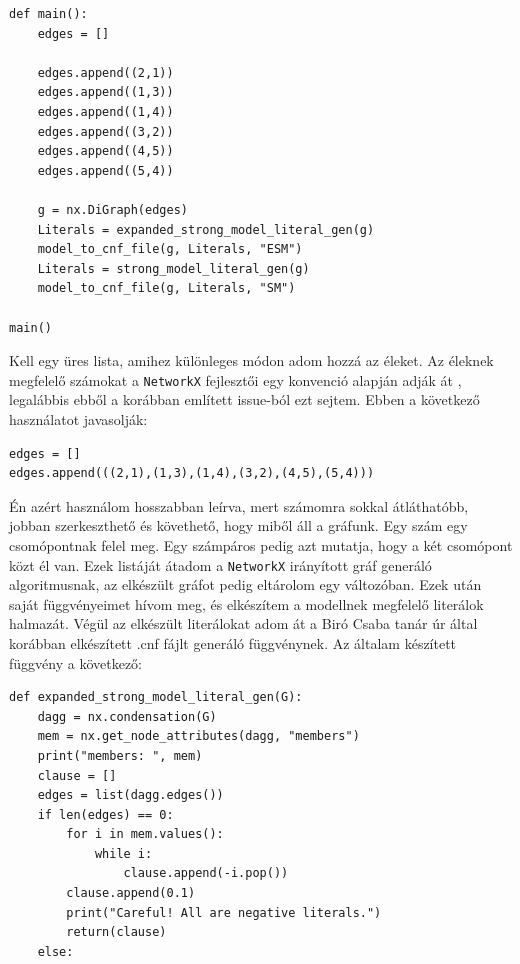 \documentclass[
]{thesis-ekf}
\theoremstyle{definition}
\theoremstyle{remark}
\begin{document}
	\begin{lstlisting}
def main():
	edges = []
	
	edges.append((2,1))
	edges.append((1,3))
	edges.append((1,4))
	edges.append((3,2))
	edges.append((4,5))
	edges.append((5,4))
	
	g = nx.DiGraph(edges)
	Literals = expanded_strong_model_literal_gen(g)
	model_to_cnf_file(g, Literals, "ESM")
	Literals = strong_model_literal_gen(g)
	model_to_cnf_file(g, Literals, "SM")
	
main()
	\end{lstlisting}

	
	Kell egy üres lista, amihez különleges módon adom hozzá az éleket. Az éleknek megfelelő számokat a \texttt{NetworkX} fejlesztői egy konvenció alapján adják át \cite{link-github-issue}, legalábbis ebből a korábban említett issue-ból ezt sejtem. Ebben a következő használatot javasolják:
	
	\begin{lstlisting}
edges = []
edges.append(((2,1),(1,3),(1,4),(3,2),(4,5),(5,4)))
	\end{lstlisting}
	
	Én azért használom hosszabban leírva, mert számomra sokkal átláthatóbb, jobban szerkeszthető és követhető, hogy miből áll a gráfunk. Egy szám egy csomópontnak felel meg. Egy számpáros pedig azt mutatja, hogy a két csomópont közt él van. Ezek listáját átadom a \texttt{NetworkX} irányított gráf generáló algoritmusnak, az elkészült gráfot pedig eltárolom egy változóban. Ezek után saját függvényeimet hívom meg, és elkészítem a modellnek megfelelő literálok halmazát. Végül az elkészült literálokat adom át a Biró Csaba tanár úr által korábban elkészített .cnf fájlt generáló függvénynek.
	\newpage
	Az általam készített függvény a következő:

	\begin{lstlisting}
def expanded_strong_model_literal_gen(G):
	dagg = nx.condensation(G)
	mem = nx.get_node_attributes(dagg, "members")
	print("members: ", mem)
	clause = []
	edges = list(dagg.edges())
	if len(edges) == 0:
		for i in mem.values():
			while i:
				clause.append(-i.pop())
		clause.append(0.1)
		print("Careful! All are negative literals.")
		return(clause)
	else:
	\end{lstlisting}
\end{document}
